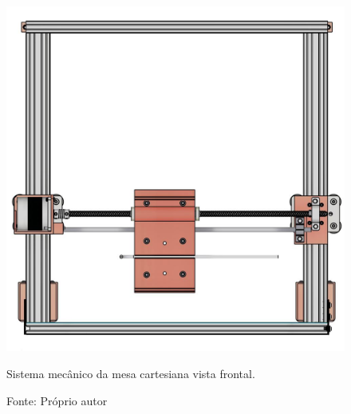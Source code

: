 \begin{figure}[H]
\centering
\includegraphics[scale = 0.25]{figuras/mesacartesianafrontal}
\caption{Sistema mecânico da mesa cartesiana vista frontal.}
\caption*{Fonte: Próprio autor}
\label{fig:mesacartesianafrontal}
\end{figure}

